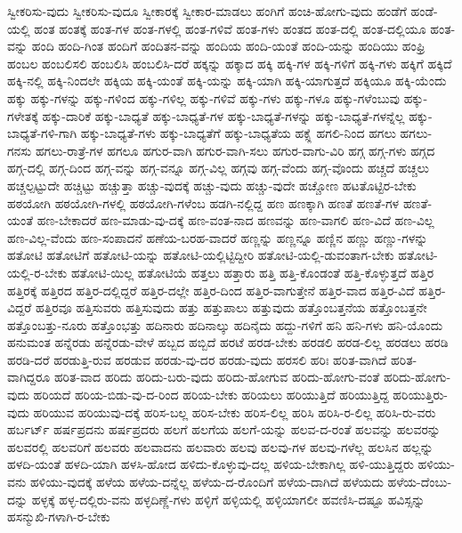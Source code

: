 {ಸ್ವೀಕರಿಸು-ವುದು
ಸ್ವೀಕರಿಸು-ವುದೂ
ಸ್ವೀಕಾರಕ್ಕೆ
ಸ್ವೀಕಾರ-ಮಾಡಲು
ಹಂಗಿಗೆ
ಹಂಚಿ-ಹೋಗು-ವುದು
ಹಂಡೆಗೆ
ಹಂಡೆ-ಯಲ್ಲಿ
ಹಂತ
ಹಂತಕ್ಕೆ
ಹಂತ-ಗಳ
ಹಂತ-ಗಳಲ್ಲಿ
ಹಂತ-ಗಳಿವೆ
ಹಂತ-ಗಳು
ಹಂತದ
ಹಂತ-ದಲ್ಲಿ
ಹಂತ-ದಲ್ಲಿಯೂ
ಹಂತ-ವನ್ನು
ಹಂದಿ
ಹಂದಿ-ಗಿಂತ
ಹಂದಿಗೆ
ಹಂದಿತನ-ವನ್ನು
ಹಂದಿಯ
ಹಂದಿ-ಯಂತೆ
ಹಂದಿ-ಯನ್ನು
ಹಂದಿಯು
ಹಂಫ್ರಿ
ಹಂಬಲ
ಹಂಬಲಿಸಲಿ
ಹಂಬಲಿಸಿ
ಹಂಬಲಿಸಿ-ದರೆ
ಹಕ್ಕನ್ನು
ಹಕ್ಕಾದ
ಹಕ್ಕಿ
ಹಕ್ಕಿ-ಗಳ
ಹಕ್ಕಿ-ಗಳಿಗೆ
ಹಕ್ಕಿ-ಗಳು
ಹಕ್ಕಿಗೆ
ಹಕ್ಕಿದೆ
ಹಕ್ಕಿ-ನಲ್ಲಿ
ಹಕ್ಕಿ-ನಿಂದಲೇ
ಹಕ್ಕಿಯ
ಹಕ್ಕಿ-ಯಂತೆ
ಹಕ್ಕಿ-ಯನ್ನು
ಹಕ್ಕಿ-ಯಾಗಿ
ಹಕ್ಕಿ-ಯಾಗುತ್ತದೆ
ಹಕ್ಕಿಯೂ
ಹಕ್ಕಿ-ಯೆಂದು
ಹಕ್ಕು
ಹಕ್ಕು-ಗಳನ್ನು
ಹಕ್ಕು-ಗಳಿಂದ
ಹಕ್ಕು-ಗಳಿಲ್ಲ
ಹಕ್ಕು-ಗಳಿವೆ
ಹಕ್ಕು-ಗಳು
ಹಕ್ಕು-ಗಳೂ
ಹಕ್ಕು-ಗಳೆಂಬುವು
ಹಕ್ಕು-ಗಳೇತಕ್ಕೆ
ಹಕ್ಕು-ದಾರಿಕೆ
ಹಕ್ಕು-ಬಾಧ್ಯತೆ
ಹಕ್ಕು-ಬಾಧ್ಯತೆ-ಗಳ
ಹಕ್ಕು-ಬಾಧ್ಯತೆ-ಗಳನ್ನು
ಹಕ್ಕು-ಬಾಧ್ಯತೆ-ಗಳನ್ನೆಲ್ಲ
ಹಕ್ಕು-ಬಾಧ್ಯತೆ-ಗಳಿ-ಗಾಗಿ
ಹಕ್ಕು-ಬಾಧ್ಯತೆ-ಗಳು
ಹಕ್ಕು-ಬಾಧ್ಯತೆಗೆ
ಹಕ್ಕು-ಬಾಧ್ಯತೆಯ
ಹಕ್ಸ್ಲೆ
ಹಗಲಿ-ನಿಂದ
ಹಗಲು
ಹಗಲು-ಗನಸು
ಹಗಲು-ರಾತ್ರೆ-ಗಳ
ಹಗಲೂ
ಹಗುರ-ವಾಗಿ
ಹಗುರ-ವಾಗಿ-ಸಲು
ಹಗುರ-ವಾಗು-ವಿರಿ
ಹಗ್ಗ
ಹಗ್ಗ-ಗಳು
ಹಗ್ಗದ
ಹಗ್ಗ-ದಲ್ಲಿ
ಹಗ್ಗ-ದಿಂದ
ಹಗ್ಗ-ವನ್ನು
ಹಗ್ಗ-ವನ್ನೂ
ಹಗ್ಗ-ವಿಲ್ಲ
ಹಗ್ಗವು
ಹಗ್ಗ-ವೆಂದು
ಹಗ್ಗ-ವೊಂದು
ಹಚ್ಚದೆ
ಹಚ್ಚಲು
ಹಚ್ಚಲ್ಪಟ್ಟುದೇ
ಹಚ್ಚಿಟ್ಟು
ಹಚ್ಚುತ್ತಾ
ಹಚ್ಚು-ವುದಕ್ಕೆ
ಹಚ್ಚು-ವುದು
ಹಚ್ಚು-ವುದೇ
ಹಚ್ಚೋಣ
ಹಟತೊಟ್ಟಿರ-ಬೇಕು
ಹಠಯೋಗಿ
ಹಠಯೋಗಿ-ಗಳಲ್ಲಿ
ಹಠಯೋಗಿ-ಗಳೆಂಬ
ಹಡಗಿ-ನಲ್ಲಿದ್ದ
ಹಣ
ಹಣಕ್ಕಾಗಿ
ಹಣತೆ
ಹಣತೆ-ಗಳ
ಹಣತೆ-ಯಂತೆ
ಹಣ-ಬೇಕಾದರೆ
ಹಣ-ಮಾಡು-ವು-ದಕ್ಕೆ
ಹಣ-ವಂತ-ನಾದ
ಹಣವನ್ನು
ಹಣ-ವಾಗಲಿ
ಹಣ-ವಿದೆ
ಹಣ-ವಿಲ್ಲ
ಹಣ-ವಿಲ್ಲ-ವೆಂದು
ಹಣ-ಸಂಪಾದನೆ
ಹಣೆಯ-ಬರಹ-ವಾದರೆ
ಹಣ್ಣನ್ನು
ಹಣ್ಣನ್ನೂ
ಹಣ್ಣಿನ
ಹಣ್ಣು
ಹಣ್ಣು-ಗಳನ್ನು
ಹತೋಟಿ
ಹತೋಟಿಗೆ
ಹತೋಟಿ-ಯನ್ನು
ಹತೋಟಿ-ಯಲ್ಲಿಟ್ಟಿದ್ದೀರಿ
ಹತೋಟಿ-ಯಲ್ಲಿ-ಡುವಂತಾಗ-ಬೇಕು
ಹತೋಟಿ-ಯಲ್ಲಿ-ರ-ಬೇಕು
ಹತೋಟಿ-ಯಿಲ್ಲ
ಹತೋಟಿಯೆ
ಹತ್ತಲು
ಹತ್ತಾರು
ಹತ್ತಿ
ಹತ್ತಿ-ಕೊಂಡಂತೆ
ಹತ್ತಿ-ಕೊಳ್ಳುತ್ತದೆ
ಹತ್ತಿರ
ಹತ್ತಿರಕ್ಕೆ
ಹತ್ತಿರದ
ಹತ್ತಿರ-ದಲ್ಲಿದ್ದರೆ
ಹತ್ತಿರ-ದಲ್ಲೇ
ಹತ್ತಿರ-ದಿಂದ
ಹತ್ತಿರ-ವಾಗುತ್ತೇನೆ
ಹತ್ತಿರ-ವಾದ
ಹತ್ತಿರ-ವಿದೆ
ಹತ್ತಿರ-ವಿದ್ದರೆ
ಹತ್ತಿರವೂ
ಹತ್ತಿಸುವರು
ಹತ್ತಿಸುವುದು
ಹತ್ತು
ಹತ್ತುಪಾಲು
ಹತ್ತುವುದು
ಹತ್ತೊಂಬತ್ತನೆಯ
ಹತ್ತೊಂಬತ್ತನೇ
ಹತ್ತೊಂಬತ್ತು-ನೂರು
ಹತ್ತೊಂಭತ್ತು
ಹದಿನಾರು
ಹದಿನಾಲ್ಕು
ಹದಿನೈದು
ಹದ್ದು-ಗಳಿಗೆ
ಹನಿ
ಹನಿ-ಗಳು
ಹನಿ-ಯೊಂದು
ಹನುಮಂತ
ಹನ್ನೆರಡು
ಹನ್ನೆರಡು-ವೇಳೆ
ಹಬ್ಬದ
ಹಬ್ಬಿದೆ
ಹರಟೆ
ಹರಡ-ಬೇಕು
ಹರಡಲಿ
ಹರಡ-ಲಿಲ್ಲ
ಹರಡಲು
ಹರಡಿ
ಹರಡಿ-ದರೆ
ಹರಡುತ್ತಿ-ರುವ
ಹರಡುವ
ಹರಡು-ವು-ದರ
ಹರಡು-ವುದು
ಹರಸಲಿ
ಹರಿಃ
ಹರಿತ-ವಾಗಿದೆ
ಹರಿತ-ವಾಗಿದ್ದರೂ
ಹರಿತ-ವಾದ
ಹರಿದು
ಹರಿದು-ಬರು-ವುದು
ಹರಿದು-ಹೋಗುವ
ಹರಿದು-ಹೋಗು-ವಂತೆ
ಹರಿದು-ಹೋಗು-ವುದು
ಹರಿಯದೆ
ಹರಿಯ-ಬಿಡು-ವು-ದ-ರಿಂದ
ಹರಿಯ-ಬೇಕು
ಹರಿಯಲು
ಹರಿಯುತ್ತಿದೆ
ಹರಿಯುತ್ತಿದ್ದ
ಹರಿಯುತ್ತಿರು-ವುದು
ಹರಿಯುವ
ಹರಿಯುವು-ದಕ್ಕೆ
ಹರಿಸ-ಬಲ್ಲ
ಹರಿಸ-ಬೇಕು
ಹರಿಸ-ಲಿಲ್ಲ
ಹರಿಸಿ
ಹರಿಸಿ-ರ-ಲಿಲ್ಲ
ಹರಿಸಿ-ರು-ವರು
ಹರ್ಬರ್ಟ್
ಹರ್ಷಪ್ರದನು
ಹರ್ಷಪ್ರದರು
ಹಲಗೆ
ಹಲಗೆಯ
ಹಲಗೆ-ಯನ್ನು
ಹಲವ-ದ-ರಂತೆ
ಹಲವನ್ನು
ಹಲವರನ್ನು
ಹಲವರಲ್ಲಿ
ಹಲವರಿಗೆ
ಹಲವರು
ಹಲವಾದನು
ಹಲವಾರು
ಹಲವು
ಹಲವು-ಗಳ
ಹಲವು-ಗಳೆಲ್ಲ
ಹಲಸಿನ
ಹಲ್ಲನ್ನು
ಹಳದಿ-ಯಂತೆ
ಹಳದಿ-ಯಾಗಿ
ಹಳಸಿ-ಹೋದ
ಹಳಿದು-ಕೊಳ್ಳುವು-ದಲ್ಲ
ಹಳಿಯ-ಬೇಕಾಗಿಲ್ಲ
ಹಳಿ-ಯುತ್ತಿದ್ದರು
ಹಳಿಯು-ವನು
ಹಳಿಯು-ವುದಕ್ಕೆ
ಹಳೆಯ
ಹಳೆಯ-ದನ್ನೆಲ್ಲ
ಹಳೆಯ-ದ-ರೊಂದಿಗೆ
ಹಳೆಯ-ದಾಗಿದೆ
ಹಳೆಯದು
ಹಳೆಯ-ದೆಂಬು-ದನ್ನು
ಹಳ್ಳಕ್ಕೆ
ಹಳ್ಳ-ದಲ್ಲಿರು-ವನು
ಹಳ್ಳದಿಣ್ಣೆ-ಗಳು
ಹಳ್ಳಿಗೆ
ಹಳ್ಳಿಯಲ್ಲಿ
ಹಳ್ಳಿಯಾಗಲೀ
ಹವಣಿಸಿ-ದಷ್ಟೂ
ಹವಿಸ್ಸನ್ನು
ಹಸನ್ಮುಖಿ-ಗಳಾಗಿ-ರ-ಬೇಕು
}
